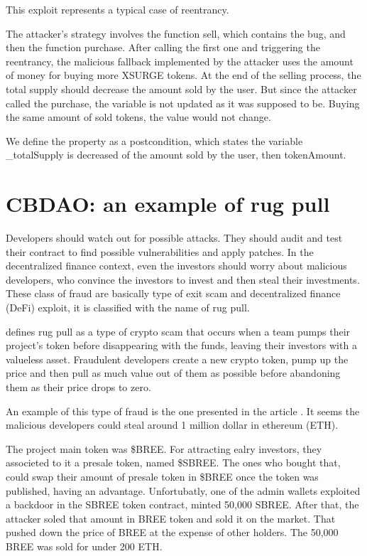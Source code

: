 This exploit represents a typical case of reentrancy. 

The attacker's strategy involves the function sell, which contains the bug, and then the function purchase. 
After calling the first one and triggering the reentrancy, the malicious fallback implemented by the attacker uses the amount of money for buying more XSURGE tokens. 
At the end of the selling process, the total supply should decrease the amount sold by the user.
But since the attacker called the purchase, the variable is not updated as it was supposed to be. 
Buying the same amount of sold tokens, the value would not change.

We define the property as a postcondition, which states the variable \_totalSupply is decreased of the amount sold by the user, then tokenAmount.

\section{CBDAO: an example of rug pull}
\label{sec:Exploits:CBDAO}
Developers should watch out for possible attacks. They should audit and test their contract to find possible vulnerabilities and apply patches.
In the decentralized finance context, even the investors should worry about malicious developers, who convince the investors to invest and then steal their investments.
These class of fraud are basically  type of exit scam and decentralized finance (DeFi) exploit, it is classified with the name of rug pull.


\citet{RugPullDef} defines rug pull as a  type of crypto scam that occurs when a team pumps their project's token before disappearing with the funds, 
leaving their investors with a valueless asset. 
Fraudulent developers create a new crypto token, 
pump up the price and then pull as much value out of them as possible before abandoning them as their price drops to zero.

An example of this type of fraud is the one presented in the article \citet{CBDAO}.
It seems the malicious developers could steal around 1 million dollar in ethereum (ETH). 

The project main token was \$BREE. For attracting ealry investors, they associeted to it a presale token, named \$SBREE. 
The ones who bought that, could swap their amount of presale token in \$BREE once the token was published, having an advantage.
Unfortubatly, one of the admin wallets exploited a backdoor in the SBREE token contract, minted 50,000 SBREE. After that, the attacker soled that amount in BREE token and sold it on the market.
That pushed down the price of BREE at the expense of other holders. The 50,000 BREE was sold for under 200 ETH.

